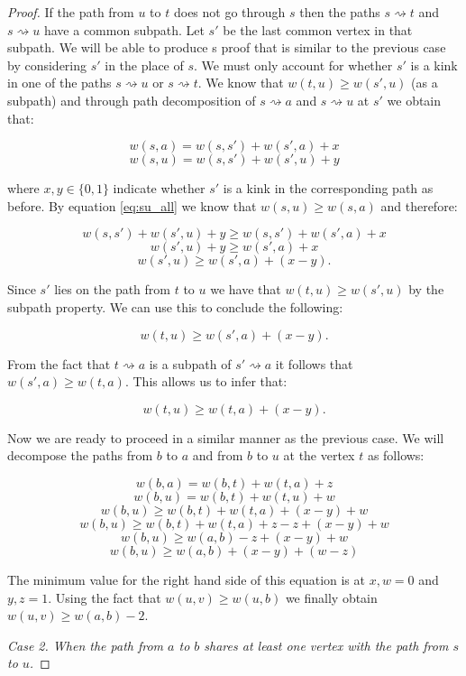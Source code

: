 \begin{proof}
If the path from $u$ to $t$ does not go through $s$ then the paths $s \rightsquigarrow t$ and $s \rightsquigarrow u$ have a common subpath. Let $s'$ be the last common vertex in that subpath. We will be able to produce s proof that is similar to the previous case by considering $s'$ in the place of $s$. We must only account for whether $s'$ is a kink in one of the paths $s \rightsquigarrow u$ or $s \rightsquigarrow t$. We know that $w(t, u) \ge w(s', u)$ (as a subpath) and through path decomposition of  $s \rightsquigarrow a$ and $s \rightsquigarrow u$ at $s'$ we obtain that:

$$ w(s, a) = w(s, s') + w(s', a) + x $$
$$ w(s, u) = w(s, s') + w(s', u) + y $$

where $x,y \in \{0, 1\}$ indicate whether $s'$ is a kink in the corresponding path as before. By equation \ref{eq:su_all} we know that $w(s, u) \ge w(s, a)$ and therefore:

$$ w(s, s') + w(s', u) + y \ge w(s, s') + w(s', a) + x  $$
$$ w(s', u) + y \ge w(s', a) + x $$
$$ w(s', u) \ge w(s', a) + (x - y).$$

Since $s'$ lies on the path from $t$ to $u$ we have that $w(t, u) \ge w(s', u)$ by the subpath property. We can use this to conclude the following:

$$ w(t, u) \ge w(s', a) + (x - y).$$

From the fact that $t \rightsquigarrow a$ is a subpath of $s' \rightsquigarrow a$ it follows that $w(s', a) \ge w(t, a)$. This allows us to infer that:

$$ w(t, u) \ge w(t, a) + (x - y). $$

Now we are ready to proceed in a similar manner as the previous case. We will decompose the paths from $b$ to $a$ and from $b$ to $u$ at the vertex $t$ as follows:

$$ w(b, a) = w(b, t) + w(t, a) + z  $$
$$ w(b, u) = w(b, t) + w(t, u) + w  $$
$$ w(b, u) \ge w(b, t) + w(t, a) + (x - y) + w $$
$$ w(b, u) \ge w(b, t) + w(t, a) + z - z + (x - y) + w $$
$$ w(b, u) \ge w(a, b) - z + (x - y) + w $$
$$ w(b, u) \ge w(a, b) + (x - y) + (w - z) $$

The minimum value for the right hand side of this equation is at $x, w = 0$ and $y, z = 1$. Using the fact that $w(u, v) \ge w(u, b)$ we finally obtain $ w(u, v) \ge w(a, b) - 2 $.


{\em Case 2. When the path from $a$ to $b$ shares at least one vertex with the path from $s$ to $u$.}


\end{proof}
